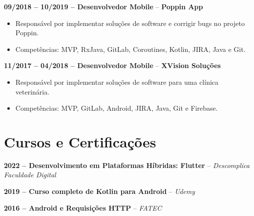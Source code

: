 \documentclass[11pt,a4paper]{article}
\newcommand{\companyname}[1]{\textcolor{secondarycolor}{\textbf{#1}}}
\begin{document}
\smallskip
\textbf{09/2018 -- 10/2019 -- Desenvolvedor Mobile} -- \companyname{Poppin App}
\begin{itemize}
    \item Responsável por implementar soluções de software e corrigir bugs no projeto Poppin.
    \item Competências: MVP, RxJava, GitLab, Coroutines, Kotlin, JIRA, Java e Git.
\end{itemize}

\smallskip
\textbf{11/2017 -- 04/2018 -- Desenvolvedor Mobile} -- \companyname{XVision Soluções}
\begin{itemize}
    \item Responsável por implementar soluções de software para uma clínica veterinária.
    \item Competências: MVP, GitLab, Android, JIRA, Java, Git e Firebase.
\end{itemize}

\section*{Cursos e Certificações}

\textbf{2022 -- Desenvolvimento em Plataformas Híbridas: Flutter} -- \textit{Descomplica Faculdade Digital}

\textbf{2019 -- Curso completo de Kotlin para Android} -- \textit{Udemy}

\textbf{2016 -- Android e Requisições HTTP} -- \textit{FATEC}
\end{document}
